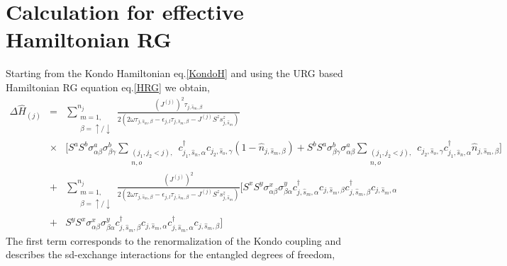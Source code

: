 \documentclass[aps,prx,preprint,groupedaddress]{revtex4-2}
\begin{document}
\section{Calculation for effective Hamiltonian RG}\label{Appendix-A}
\par\noindent
Starting from the Kondo Hamiltonian eq.\eqref{KondoH} and using the URG based Hamiltonian RG equation eq.\eqref{HRG} we obtain,
\begin{eqnarray}
\Delta\hat{H}_{(j)} &=& \sum_{\substack{m=1,\\ \beta=\uparrow/\downarrow}}^{n_{j}}\frac{(J^{(j)})^{2}\tau_{j,\hat{s}_{m},\beta}}{2(2\omega\tau_{j,\hat{s}_{m},\beta} - \epsilon_{j,l}\tau_{j,\hat{s}_{m},\beta}-J^{(j)}S^{z}s^{z}_{j,\hat{s}_{m}})}\nonumber\\
&\times & \bigg[S^{a}S^{b}\sigma^{a}_{\alpha\beta}\sigma^{b}_{\beta\gamma} \sum_{\substack{(j_{1},j_{2}< j),\\ n,o}}c^{\dagger}_{j_{1},\hat{s}_{n},\alpha}c_{j_{2},\hat{s}_{o},\gamma}(1-\hat{n}_{j,\hat{s}_{m},\beta})+S^{b}S^{a}\sigma^{b}_{\beta\gamma}\sigma^{a}_{\alpha\beta} \sum_{\substack{(j_{1},j_{2}<j),\\ n,o}}c_{j_{2},\hat{s}_{o},\gamma}c^{\dagger}_{j_{1},\hat{s}_{n},\alpha}\hat{n}_{j,\hat{s}_{m},\beta}\bigg]\nonumber\\
&+&\sum_{\substack{m=1,\\ \beta=\uparrow/\downarrow}}^{n_{j}}\frac{(J^{(j)})^{2}}{2(2\omega\tau_{j,\hat{s}_{m},\beta} - \epsilon_{j,l}\tau_{j,\hat{s}_{m},\beta}-J^{(j)}S^{z}s^{z}_{j,\hat{s}_{m}})}\bigg[S^{x}S^{y}\sigma^{x}_{\alpha\beta}\sigma^{y}_{\beta\alpha}c^{\dagger}_{j,\hat{s}_{m},\alpha}c_{j,\hat{s}_{m},\beta}c^{\dagger}_{j,\hat{s}_{m},\beta}c_{j,\hat{s}_{m},\alpha}\nonumber\\
&+&S^{y}S^{x}\sigma^{x}_{\alpha\beta}\sigma^{y}_{\beta\alpha}c^{\dagger}_{j,\hat{s}_{m},\beta}c_{j,\hat{s}_{m},\alpha}c^{\dagger}_{j,\hat{s}_{m},\alpha}c_{j,\hat{s}_{m},\beta}\bigg]
\end{eqnarray}
The first term corresponds to the renormalization of the Kondo coupling and describes the sd-exchange interactions for the entangled degrees of freedom,
\end{document}
